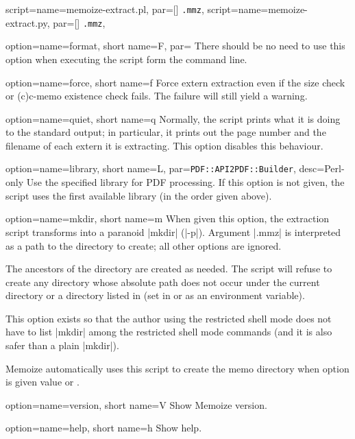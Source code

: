 \documentclass[a4paper,11pt]{article}
\begin{document}
\begin{doc}{
    script={name=memoize-extract.pl, par=[] \texttt{.mmz}},
    script={name=memoize-extract.py, par=[] \texttt{.mmz}},
  }
\begin{doc}{
      option={name=format, short name=F,
        par=\Alt{}\Alt{}}
    }
    There should be no need to use this option when executing the script form
    the command line.
  \end{doc}
  \begin{doc}{
      option={name=force, short name=f}
    }
    Force extern extraction even if the size check or (c)c-memo existence check
    fails.  The failure will still yield a warning.
  \end{doc}
  \begin{doc}{
      option={name=quiet, short name=q}
    }
    Normally, the script prints what it is doing to the standard output; in
    particular, it prints out the page number and the filename of each extern
    it is extracting.  This option disables this behaviour.
  \end{doc}
  \begin{doc}{
    option={name=library, short name=L,
      par=\texttt{PDF::API2\Alt PDF::Builder}, desc=Perl-only}
  }
  Use the specified library for PDF processing.  If this option is not given,
  the script uses the first available library (in the order given above).
  \end{doc}
  \begin{doc}{
      option={name=mkdir, short name=m}
    }
    When given this option, the extraction script transforms into a paranoid
    |mkdir| (|-p|).  Argument |.mmz| is interpreted as a path to the
    directory to create; all other options are ignored.

    The ancestors of the directory are created as needed.  The script will
    refuse to create any directory whose absolute path does not occur under the
    current directory or a directory listed in  (set in
     or as an environment variable).

    This option exists so that the author using the restricted shell mode does
    not have to list |mkdir| among the restricted shell mode commands (and it
    is also safer than a plain |mkdir|).

    Memoize automatically uses this script to create the memo directory when
    option  is given value  or
    .
  \end{doc}
  \begin{doc}{
      option={name=version, short name=V}
    }
    Show Memoize version.
  \end{doc}
  \begin{doc}{
      option={name=help, short name=h}
    }
    Show help.
  \end{doc}


\end{doc}
\end{document}
